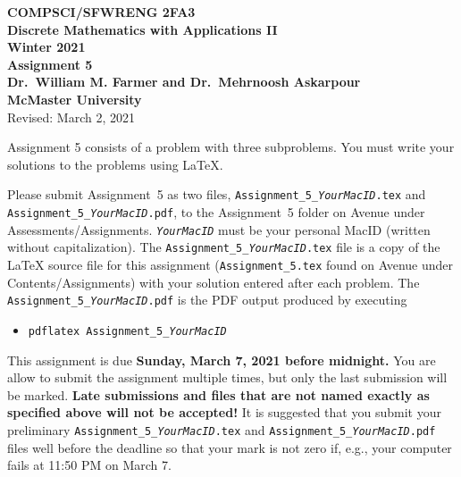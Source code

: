 \documentclass[11pt,fleqn]{article}
\begin{document}
	
	\begin{center}
		
		{\large \textbf{COMPSCI/SFWRENG 2FA3}}\\[2mm]
		{\large \textbf{Discrete Mathematics with Applications II}}\\[2mm]
		{\large \textbf{Winter 2021}}\\[8mm]
		{\huge \textbf{Assignment 5}}\\[6mm]
		{\large \textbf{Dr.~William M. Farmer and Dr.~Mehrnoosh Askarpour}}\\[2mm]
		{\large \textbf{McMaster University}}\\[6mm]
		{\large Revised: March 2, 2021}
		
	\end{center}
	
	\medskip
	
	Assignment 5 consists of a problem with three subproblems.  You must write your solutions
	to the problems using LaTeX.
	
	Please submit Assignment~5 as two files,
	\texttt{Assignment\_5\_\emph{YourMacID}.tex} and
	\texttt{Assignment\_5\_\emph{YourMacID}.pdf}, to the Assignment~5
	folder on Avenue under Assessments/Assignments.
	\texttt{\emph{YourMacID}} must be your personal MacID (written without
	capitalization).  The \texttt{Assignment\_5\_\emph{YourMacID}.tex}
	file is a copy of the LaTeX source file for this assignment
	(\texttt{Assignment\_5.tex} found on Avenue under
	Contents/Assignments) with your solution entered after each problem.
	The \texttt{Assignment\_5\_\emph{YourMacID}.pdf} is the PDF output
	produced by executing
	
	\begin{itemize}
		
		\item[] \texttt{pdflatex Assignment\_5\_\emph{YourMacID}}
		
	\end{itemize}
	
	This assignment is due \textbf{Sunday, March 7, 2021 before
		midnight.}  You are allow to submit the assignment multiple times,
	but only the last submission will be marked.  \textbf{Late submissions
		and files that are not named exactly as specified above will not be
		accepted!}  It is suggested that you submit your preliminary
	\texttt{Assignment\_5\_\emph{YourMacID}.tex} and
	\texttt{Assignment\_5\_\emph{YourMacID}.pdf} files well before the
	deadline so that your mark is not zero if, e.g., your computer fails
	at 11:50 PM on March 7.
	
\end{document}
